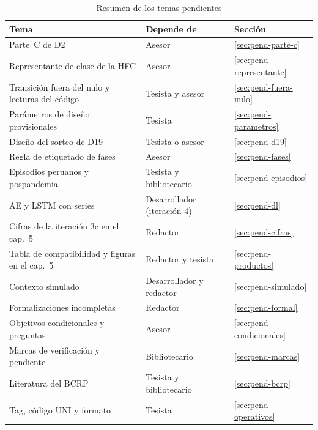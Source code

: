 \begin{table}[htbp]
\centering
\small
\caption{Resumen de los temas pendientes}
\label{tab:pendientes}
\begin{tabular}{@{}>{\raggedright\arraybackslash}p{}>{\raggedright\arraybackslash}p{}l@{}}
\toprule
Tema & Depende de & Sección \\
\midrule
Parte~C de D2 & Asesor & \cref{sec:pend-parte-c} \\
Representante de clase de la HFC & Asesor & \cref{sec:pend-representante} \\
Transición fuera del nulo y lecturas del código & Tesista y asesor & \cref{sec:pend-fuera-nulo} \\
Parámetros de diseño provisionales & Tesista & \cref{sec:pend-parametros} \\
Diseño del sorteo de D19 & Tesista o asesor & \cref{sec:pend-d19} \\
Regla de etiquetado de fases & Asesor & \cref{sec:pend-fases} \\
Episodios peruanos y pospandemia & Tesista y bibliotecario & \cref{sec:pend-episodios} \\
AE y LSTM con \nSeries{} series & Desarrollador (iteración 4) & \cref{sec:pend-dl} \\
Cifras de la iteración 3c en el cap.~5 & Redactor & \cref{sec:pend-cifras} \\
Tabla de compatibilidad y figuras en el cap.~5 & Redactor y tesista & \cref{sec:pend-productos} \\
Contexto simulado & Desarrollador y redactor & \cref{sec:pend-simulado} \\
Formalizaciones incompletas & Redactor & \cref{sec:pend-formal} \\
Objetivos condicionales y preguntas & Asesor & \cref{sec:pend-condicionales} \\
Marcas de verificación y pendiente & Bibliotecario & \cref{sec:pend-marcas} \\
Literatura del BCRP & Tesista y bibliotecario & \cref{sec:pend-bcrp} \\
Tag, código UNI y formato & Tesista & \cref{sec:pend-operativos} \\
\bottomrule
\end{tabular}
\end{table}
